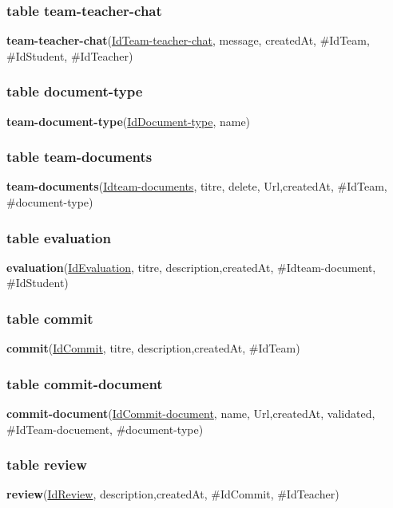 \documentclass[11pt,fleqn]{book} %
\begin{document}
\subsubsection{table team-teacher-chat}
\hspace{3em}\textbf{team-teacher-chat}(\underline{IdTeam-teacher-chat}, message, createdAt, \#IdTeam, \#IdStudent, \#IdTeacher)

\subsubsection{table document-type}
\hspace{3em}\textbf{team-document-type}(\underline{IdDocument-type}, name)

\subsubsection{table team-documents}
\hspace{3em}\textbf{team-documents}(\underline{Idteam-documents}, titre, delete, Url,createdAt, \#IdTeam, \#document-type)

\subsubsection{table evaluation}
\hspace{3em}\textbf{evaluation}(\underline{IdEvaluation}, titre, description,createdAt, \#Idteam-document, \#IdStudent)

\subsubsection{table commit}
\hspace{3em}\textbf{commit}(\underline{IdCommit}, titre, description,createdAt, \#IdTeam)
\subsubsection{table commit-document}
\hspace{3em}\textbf{commit-document}(\underline{IdCommit-document}, name, Url,createdAt, validated, \#IdTeam-docuement, \#document-type)
\subsubsection{table review}
\hspace{3em}\textbf{review}(\underline{IdReview}, description,createdAt, \#IdCommit, \#IdTeacher)
\end{document}
